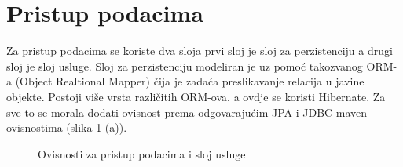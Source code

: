 \documentclass[times, utf8, zavrsni]{fer}
\begin{document}
\section{Pristup podacima}
Za pristup podacima se koriste dva sloja prvi sloj je sloj za perzistenciju a drugi sloj je sloj usluge. Sloj za perzistenciju
modeliran je uz pomoć takozvanog ORM-a (Object Realtional Mapper) čija je zadaća preslikavanje relacija u javine objekte.
Postoji više vrsta različitih ORM-ova, a ovdje se koristi Hibernate. Za sve to se morala dodati ovisnost prema odgovarajućim
JPA i JDBC maven ovisnostima (slika \ref{fig:Data dependencies} (a)).
\begin{figure}[h]
      \centering
      \caption{Ovisnosti za pristup podacima i sloj usluge}
      \label{fig:Data dependencies}
\end{figure}
\end{document}
